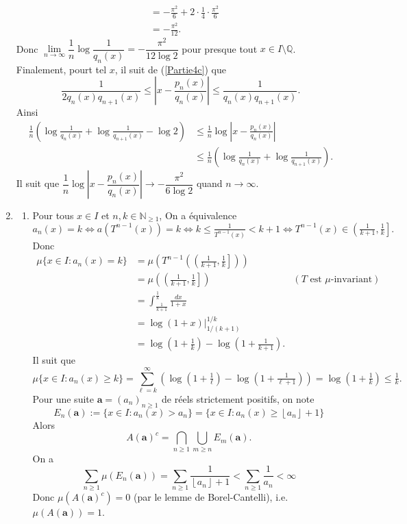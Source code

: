 \documentclass[french]{article}
\theoremstyle{definition}
\newcommand{\tuple}[1]{\left(#1\right)}
\newcommand{\oin}[1]{\left(#1\right)}
\newcommand{\olin}[1]{\left(#1\right]}
\newcommand{\abs}[1]{\left|#1\right|}
\newcommand{\floor}[1]{\left\lfloor#1\right\rfloor}
\newcommand{\Nbb}{\mathbb{N}}
\newcommand{\Qbb}{\mathbb{Q}}
\newcommand{\abf}{\mathbf{a}}
\begin{document}
\begin{enumerate}
\begin{align*}
                & = -\frac{\pi^2}{6} + 2\cdot \frac{1}{4} \cdot \frac{\pi^2}{6}\\
                & = -\frac{\pi^2}{12}.
            \end{align*}
        Donc $\lim\limits_{n \to \infty}\dfrac{1}{n}\log\dfrac{1}{q_n(x)} = -\dfrac{\pi^2}{12 \log 2}$ pour presque tout $x \in I \setminus \Qbb$. Finalement, pourt tel $x$, il suit de (\ref{Partie4c}) que
            $$\frac{1}{2q_n(x)q_{n+1}(x)} \le \abs{x - \frac{p_n(x)}{q_n(x)}} \le \frac{1}{q_n(x)q_{n+1}(x)}.$$
        Ainsi
           \begin{align*}
                \frac{1}{n}\oin{\log\frac{1}{q_n(x)} + \log\frac{1}{q_{n+1}(x)} - \log 2} & \le \frac{1}{n}\log\abs{x - \frac{p_n(x)}{q_n(x)}} \\
                & \le  \frac{1}{n}\oin{\log\frac{1}{q_n(x)} + \log\frac{1}{q_{n+1}(x)}}.
           \end{align*}
        Il suit que $\dfrac{1}{n}\log\abs{x - \dfrac{p_n(x)}{q_n(x)}} \to -\dfrac{\pi^2}{6\log 2}$ quand $n \to \infty$.
            
    \item \label{Partie13}
        \begin{enumerate}
            \item \label{Partie13a} Pour tous $x \in I$ et $n,k \in \Nbb_{\ge 1}$, On a \'equivalence
                $$a_n(x) = k \Leftrightarrow a(T^{n-1}(x)) = k \Leftrightarrow k \le \tfrac{1}{T^{n-1}(x)} < k+1 \Leftrightarrow T^{n-1}(x) \in \olin{\tfrac{1}{k+1},\tfrac{1}{k}}.$$
            Donc
                \begin{align*}
                    \mu\{x \in I : a_n(x) = k \} & = \mu\tuple{T^{n-1}\tuple{\olin{\tfrac{1}{k+1},\tfrac{1}{k}}}} \\
                    & = \mu\tuple{\olin{\tfrac{1}{k+1},\tfrac{1}{k}}} & (T \text{ est } \mu \text{-invariant})\\
                    & = \int_{\tfrac{1}{k+1}}^{\tfrac{1}{k}} \frac{dx}{1+x}\\
                    & = \log(1+x) \Big|^{1/k}_{1/(k+1)}\\
                    & = \log \tuple{1 + \tfrac{1}{k}} - \log\tuple{1 + \tfrac{1}{k+1}}.
                \end{align*}
            Il suit que
                 $$\mu\{x \in I : a_n(x) \ge k\} = \sum_{\ell = k}^{\infty} \tuple{\log \tuple{1 + \tfrac{1}{\ell}} - \log\tuple{1 + \tfrac{1}{\ell+1}}} = \log\tuple{1 + \tfrac{1}{k}} \le \tfrac{1}{k}.$$
            Pour une suite $\abf = (a_n)_{n \ge 1}$ de r\'eels strictement positifs, on note
                $$E_n(\abf):=\{x \in I : a_n(x) > a_n\} = \{x \in I: a_n(x) \ge \floor{a_n} + 1\}$$
            Alors
                $$A(\abf)^c = \bigcap_{n \ge 1} \bigcup_{m \ge n} E_m(\abf).$$
            On a
                $$\sum_{n \ge 1}\mu(E_n(\abf)) = \sum_{n \ge 1}\frac{1}{\floor{a_n} + 1} < \sum_{n \ge 1}\frac{1}{a_n} < \infty$$
            Donc $\mu(A(\abf)^c) = 0$ (par le lemme de Borel-Cantelli), i.e. $\mu(A(\abf)) = 1$.
            

\end{enumerate}
\end{enumerate}
\end{document}
